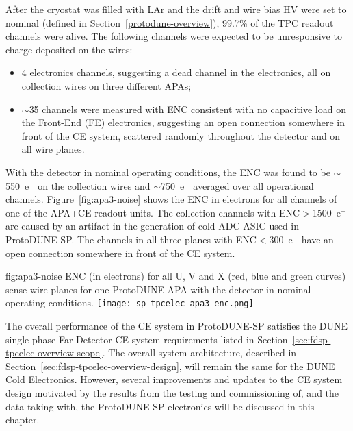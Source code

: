 After the cryostat was filled with LAr and the drift and wire bias HV were set to nominal (defined in Section~\ref{protodune-overview}), 99.7\% of the TPC readout channels were alive. The following channels were expected to be unresponsive to charge deposited on the wires:
\begin{itemize}
\item 4 electronics channels, suggesting a dead channel in the electronics, all on collection wires on three different APAs;
\item $\sim$35 channels were measured with ENC consistent with no capacitive load on the Front-End (FE) electronics, suggesting an open connection somewhere in front of the CE system, scattered randomly throughout the detector and on all wire planes.
\end{itemize}
With the detector in nominal operating conditions, the ENC was found to be $\sim$550~e$^-$ on the collection wires and $\sim$750~e$^-$ averaged over all operational channels. Figure~\ref{fig:apa3-noise} shows the ENC in electrons for all channels of one of the APA+CE readout units. The collection channels with ENC$>$1500~e$^-$ are caused by an artifact in the generation of cold ADC ASIC used in ProtoDUNE-SP. The channels in all three planes with ENC$<$300~e$^-$ have an open connection somewhere in front of the CE system.

\begin{dunefigure}
{fig:apa3-noise}
{ENC (in electrons) for all U, V and X (red, blue and green curves) sense wire planes for one ProtoDUNE APA with the detector in nominal operating conditions.}
\texttt{[image: sp-tpcelec-apa3-enc.png]}
\end{dunefigure}

The overall performance of the CE system in ProtoDUNE-SP satisfies the DUNE single phase Far Detector CE system requirements listed in Section~\ref{sec:fdsp-tpcelec-overview-scope}. The overall system architecture, described in Section~\ref{sec:fdsp-tpcelec-overview-design}, will remain the same for the DUNE Cold Electronics. However, several improvements and updates to the CE system design motivated by the results from the testing and commissioning of, and the data-taking with, the ProtoDUNE-SP electronics will be discussed in this chapter.
